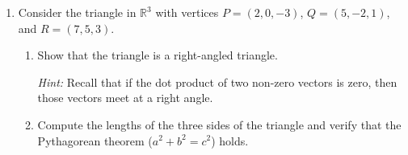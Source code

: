 \documentclass[12pt]{article}
\newcommand{\points}[1]{\marginpar{\hspace{24pt}[#1]}}
\newcommand{\R}{\mathbb{R}}
\begin{document}
\begin{enumerate}
\newpage

\item Consider the triangle in $\R^3$ with vertices $P=(2,0,-3)$, $Q=(5,-2,1)$, and $R=(7,5,3)$.
\begin{enumerate}
 \item Show that the triangle is a right-angled triangle. \points{3}

{\em Hint:} Recall that if the dot product of two non-zero vectors is zero, then those vectors meet at a right angle.

\vspace{4in}

 \item Compute the lengths of the three sides of the triangle and verify that the Pythagorean theorem ($a^2+b^2=c^2$) holds. \points{2}




\end{enumerate}
 
\end{enumerate}
\end{document}
